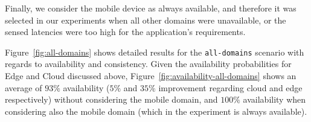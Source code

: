 Finally, we consider the mobile device as always available, and therefore it was selected in our experiments when all other domains were unavailable, or the sensed latencies were too high for the application's requirements.





Figure~\ref{fig:all-domains} shows detailed results for the \texttt{all-domains} scenario with regards to availability and consistency. 
Given the availability probabilities for Edge and Cloud discussed above, Figure~\ref{fig:availability-all-domains} shows an average of $93\%$ availability ($5\%$ and $35\%$ improvement regarding cloud and edge respectively) without considering the mobile domain, and $100\%$ availability when considering also the mobile domain (which in the experiment is always available). 

